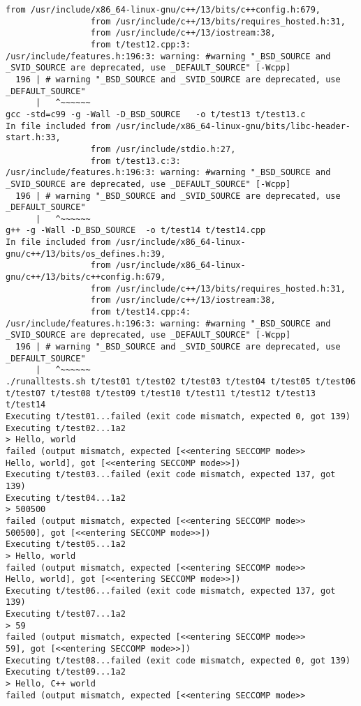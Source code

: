 \begin{lstlisting}[caption=\textit{Error message} pembangunan \textit{sandbox} pada \textit{Ubuntu} 23.10, label=kode:errormsg2310]
                 from /usr/include/x86_64-linux-gnu/c++/13/bits/c++config.h:679,
                 from /usr/include/c++/13/bits/requires_hosted.h:31,
                 from /usr/include/c++/13/iostream:38,
                 from t/test12.cpp:3:
/usr/include/features.h:196:3: warning: #warning "_BSD_SOURCE and _SVID_SOURCE are deprecated, use _DEFAULT_SOURCE" [-Wcpp]
  196 | # warning "_BSD_SOURCE and _SVID_SOURCE are deprecated, use _DEFAULT_SOURCE"
      |   ^~~~~~~
gcc -std=c99 -g -Wall -D_BSD_SOURCE   -o t/test13 t/test13.c
In file included from /usr/include/x86_64-linux-gnu/bits/libc-header-start.h:33,
                 from /usr/include/stdio.h:27,
                 from t/test13.c:3:
/usr/include/features.h:196:3: warning: #warning "_BSD_SOURCE and _SVID_SOURCE are deprecated, use _DEFAULT_SOURCE" [-Wcpp]
  196 | # warning "_BSD_SOURCE and _SVID_SOURCE are deprecated, use _DEFAULT_SOURCE"
      |   ^~~~~~~
g++ -g -Wall -D_BSD_SOURCE  -o t/test14 t/test14.cpp
In file included from /usr/include/x86_64-linux-gnu/c++/13/bits/os_defines.h:39,
                 from /usr/include/x86_64-linux-gnu/c++/13/bits/c++config.h:679,
                 from /usr/include/c++/13/bits/requires_hosted.h:31,
                 from /usr/include/c++/13/iostream:38,
                 from t/test14.cpp:4:
/usr/include/features.h:196:3: warning: #warning "_BSD_SOURCE and _SVID_SOURCE are deprecated, use _DEFAULT_SOURCE" [-Wcpp]
  196 | # warning "_BSD_SOURCE and _SVID_SOURCE are deprecated, use _DEFAULT_SOURCE"
      |   ^~~~~~~
./runalltests.sh t/test01 t/test02 t/test03 t/test04 t/test05 t/test06 t/test07 t/test08 t/test09 t/test10 t/test11 t/test12 t/test13 t/test14
Executing t/test01...failed (exit code mismatch, expected 0, got 139)
Executing t/test02...1a2
> Hello, world
failed (output mismatch, expected [<<entering SECCOMP mode>>
Hello, world], got [<<entering SECCOMP mode>>])
Executing t/test03...failed (exit code mismatch, expected 137, got 139)
Executing t/test04...1a2
> 500500
failed (output mismatch, expected [<<entering SECCOMP mode>>
500500], got [<<entering SECCOMP mode>>])
Executing t/test05...1a2
> Hello, world
failed (output mismatch, expected [<<entering SECCOMP mode>>
Hello, world], got [<<entering SECCOMP mode>>])
Executing t/test06...failed (exit code mismatch, expected 137, got 139)
Executing t/test07...1a2
> 59
failed (output mismatch, expected [<<entering SECCOMP mode>>
59], got [<<entering SECCOMP mode>>])
Executing t/test08...failed (exit code mismatch, expected 0, got 139)
Executing t/test09...1a2
> Hello, C++ world
failed (output mismatch, expected [<<entering SECCOMP mode>>

\end{lstlisting}
